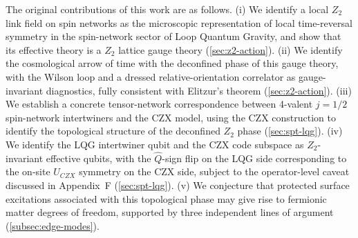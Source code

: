 \documentclass[preprint]{SciPost}
\theoremstyle{plain} %
\begin{document}
The original contributions of this work are as follows. (i) We identify a local $ Z_2 $ link field on spin networks as the microscopic representation of local time-reversal symmetry in the spin-network sector of Loop Quantum Gravity, and show that its effective theory is a $ Z_2 $ lattice gauge theory (\autoref{sec:z2-action}). (ii) We identify the cosmological arrow of time with the deconfined phase of this gauge theory, with the Wilson loop and a dressed relative-orientation correlator as gauge-invariant diagnostics, fully consistent with Elitzur's theorem (\autoref{sec:z2-action}). (iii) We establish a concrete tensor-network correspondence between 4-valent $ j=1/2 $ spin-network intertwiners and the CZX model, using the CZX construction to identify the topological structure of the deconfined $ Z_2 $ phase (\autoref{sec:spt-lqg}). (iv) We identify the LQG intertwiner qubit and the CZX code subspace as $Z_2$-invariant effective qubits, with the $ \hat{Q} $-sign flip on the LQG side corresponding to the on-site $ U_{CZX} $ symmetry on the CZX side, subject to the operator-level caveat discussed in Appendix~F (\autoref{sec:spt-lqg}). (v) We conjecture that protected surface excitations associated with this topological phase may give rise to fermionic matter degrees of freedom, supported by three independent lines of argument (\autoref{subsec:edge-modes}).
\end{document}
